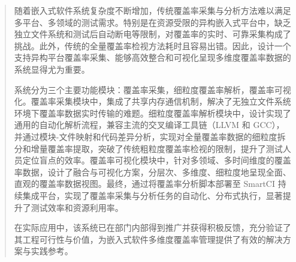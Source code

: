 

\begin{abstract}
    随着嵌入式软件系统复杂度不断增加，传统覆盖率采集与分析方法难以满足多平台、多领域的测试需求。特别是在资源受限的异构嵌入式平台中，缺乏独立文件系统和测试后自动断电等限制，对覆盖率的实时、可靠采集构成了挑战。此外，传统的全量覆盖率检视方法耗时且容易出错。因此，设计一个支持异构平台覆盖率采集、能够高效整合和可视化呈现多维度覆盖率数据的系统显得尤为重要。

    系统分为三个主要功能模块：覆盖率采集，细粒度覆盖率解析，覆盖率可视化。覆盖率采集模块中，集成了共享内存通信机制，解决了无独立文件系统环境下覆盖率数据实时传输的难题。细粒度覆盖率解析模块中，设计实现了通用的自动化解析流程，兼容主流的交叉编译工具链（LLVM 和 GCC），并通过模块-文件映射和代码差异分析，实现对全量覆盖率数据的细粒度拆分和增量覆盖率提取，突破了传统粗粒度覆盖率检视的限制，提升了测试人员定位盲点的效率。覆盖率可视化模块中，针对多领域、多时间维度的覆盖率数据，设计了融合与可视化方案，分层次、多维度、细粒度地呈现全面、直观的覆盖率数据视图。最终，通过将覆盖率分析脚本部署至 SmartCI 持续集成平台，实现了覆盖率采集与分析任务的自动化、分布式执行，显著提升了测试效率和资源利用率。

    在实际应用中，该系统已在部门内部得到推广并获得积极反馈，充分验证了其工程可行性与价值，为嵌入式软件多维度覆盖率管理提供了有效的解决方案与实践参考。
\end{abstract}

